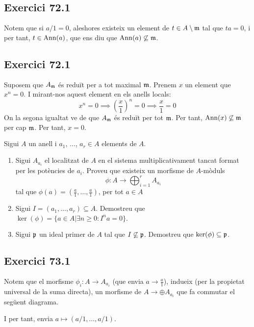 \documentclass[11pt, a4paper]{article}
\begin{document}
\subsection{Exercici 72.1}
Notem que si $a/1 = 0$, aleshores existeix un element de $t\in A\setminus \mathfrak m$ tal que $ta=0$, i per tant, $t\in \mathrm{Ann}(a)$, que ens diu que $\mathrm{Ann}(a)\not\subseteq \mathfrak m$.
\subsection{Exercici 72.1}
Suposem que $A_\mathfrak m$ és reduït per a tot maximal $\mathfrak m$. Prenem $x$ un element que $x^n=0$. I mirant-nos aquest element en els anells locals: 
\[
x^n=0\implies \left(\frac{x} {1}\right)^n=0\implies\frac{x}{1}=0
\]
On la segona igualtat ve de que $A_\mathfrak m$ és reduït per tot $\mathfrak m$. Per tant, $\mathrm{Ann}(x)\not \subseteq \mathfrak m$ per cap $\mathfrak m$. Per tant, $x=0$.
\newpage
\begin{tcolorbox}[title=\section{Exercici 73}]
    Sigui $A$ un anell i $a_1$, $\dots$, $a_r\in A$ elements de $A$.
    \begin{enumerate}
        \item Sigui $A_{a_i}$ el localitzat de $A$ en el sistema multiplicativament tancat format per les potències de $a_i$. Proveu que existeix un morfisme de $A$-mòduls
\[
    \phi: A\to \bigoplus_{i=1}^r A_{a_i}
\] tal que $\phi(a)=(\frac{a}{1},\dots, \frac{a}{1})$, per tot $a\in A$
        \item Sigui $I=(a_1,\dots,a_r)\subseteq A$. Demostreu que $\ker(\phi)=\{a\in A|\exists n\geq 0: I^na=0\}$.
        \item Sigui $\mathfrak p$ un ideal primer de $A$ tal que $I\not\subseteq \mathfrak p$. Demostreu que $\ker(\phi)\subseteq \mathfrak p$.
    \end{enumerate}
\end{tcolorbox}
\subsection{Exercici 73.1}
Notem que el morfisme $\phi_i:A\to A_{a_i}$ (que envia $a\to \frac{a}{1}$), indueix (per la propietat universal de la suma directa), un morfisme de $A\to \oplus A_{a_i}$ que fa commutar el següent diagrama.
\begin{center}
\end{center}
I per tant, envia $a\mapsto (a/1,\dots, a/1)$.
\end{document}
